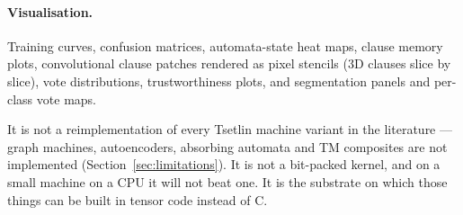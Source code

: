 \paragraph{Visualisation.}
Training curves, confusion matrices, automata-state heat maps, clause memory plots,
convolutional clause patches rendered as pixel stencils (3D clauses slice by slice), vote
distributions, trustworthiness plots, and segmentation panels and per-class vote maps.

\begin{ttcallout}
It is not a reimplementation of every Tsetlin machine variant in the literature --- graph
machines, autoencoders, absorbing automata and TM composites are not implemented
(Section~\ref{sec:limitations}). It is not a bit-packed kernel, and on a small machine on a
CPU it will not beat one. It is the substrate on which those things can be built in tensor
code instead of C.
\end{ttcallout}
